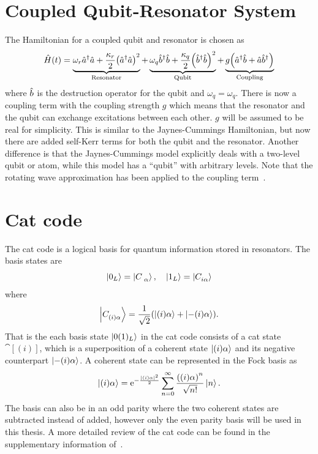 \documentclass[main.tex]{subfiles}
\begin{document}
\section{Coupled Qubit-Resonator System}
The Hamiltonian for a coupled qubit and resonator is chosen as
\begin{equation}
    \Ham(t) = \underbrace{\omega_r\au\ad + \frac{\kappa_r}{2}\qty(\au\ad)^2}_{\text{Resonator}} + \underbrace{\omega_{q}\bu\bd + \frac{\kappa_q}{2}\qty(\bu\bd)^2}_{\text{Qubit}} + \underbrace{g\qty(\au\bd+\ad\bu)}_{\text{Coupling}}
    \label{eq:hamiltonian-coupled}
\end{equation}
where \( \bd \) is the destruction operator for the qubit and \( \omega_q = \omega_q \).
There is now a coupling term with the coupling strength \(g\) which means that the resonator and the qubit can exchange excitations between each other.
\(g\) will be assumed to be real for simplicity.
This is similar to the Jaynes-Cummings Hamiltonian, but now there are added self-Kerr terms for both the qubit and the resonator.
Another difference is that the Jaynes-Cummings model explicitly deals with a two-level qubit or atom, while this model has a ``qubit'' with arbitrary levels.
Note that the rotating wave approximation has been applied to the coupling term~\cite{wu_strong-coupling_2007}.

\section{Cat code}
The cat code is a logical basis for quantum information stored in resonators.
The basis states are
\begin{equation}
    \ket{0_L} = \cat{},\quad \ket{1_L} = \cat[i]{}
\end{equation}
where 
\begin{equation}
    \cat[(i)]{} = \frac{1}{\sqrt{2}}\qty(\ket{(i)\alpha} + \ket{-(i)\alpha}).
\end{equation}
That is the each basis state \( \ket{0(1)_L} \) in the cat code consists of a cat state \(\cat[(i)]{}\), which is a superposition of a coherent state \(\ket{(i)\alpha}\) and its negative counterpart \(\ket{-(i)\alpha}\).
A coherent state can be represented in the Fock basis as
\begin{equation}
    \ket{(i)\alpha} =\ex^{-{\frac{|(i)\alpha|^2}{2}}}\sum_{n=0}^{\infty}{\frac{\qty((i)\alpha)^n}{\sqrt{n!}}}\ket{n}.
\end{equation}
The basis can also be in an odd parity where the two coherent states are subtracted instead of added, however only the even parity basis will be used in this thesis.
A more detailed review of the cat code can be found in the supplementary information of~\cite{ofek_extending_2016}.
\end{document}
